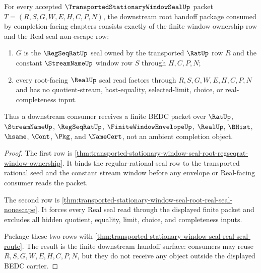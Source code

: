 \begin{theorem}
\label{thm:transported-stationary-window-seal-root-downstream-handoff-package}
For every accepted $\TransportedStationaryWindowSealUp$ packet $T=(R,S,G,W,E,H,C,P,N)$, the downstream root handoff package consumed by completion-facing chapters consists exactly of the finite window ownership row and the Real seal non-escape row:
\begin{enumerate}
\item $G$ is the $\RegSeqRatUp$ seal owned by the transported $\RatUp$ row $R$ and the constant $\StreamNameUp$ window row $S$ through $H,C,P,N$;
\item every root-facing $\RealUp$ seal read factors through $R,S,G,W,E,H,C,P,N$ and has no quotient-stream, host-equality, selected-limit, choice, or real-completeness input.
\end{enumerate}
Thus a downstream consumer receives a finite BEDC packet over $\RatUp$, $\StreamNameUp$, $\RegSeqRatUp$, $\FiniteWindowEnvelopeUp$, $\RealUp$, $\BHist$, $\hsame$, $\Cont$, $\Pkg$, and $\NameCert$, not an ambient completion object.
\end{theorem}
\begin{proof}
The first row is \autoref{thm:transported-stationary-window-seal-root-regseqrat-window-ownership}. It binds the regular-rational seal row to the transported rational seed and the constant stream window before any envelope or Real-facing consumer reads the packet.

The second row is \autoref{thm:transported-stationary-window-seal-root-real-seal-nonescape}. It forces every Real seal read through the displayed finite packet and excludes all hidden quotient, equality, limit, choice, and completeness inputs.

Package these two rows with \autoref{thm:transported-stationary-window-seal-real-seal-route}. The result is the finite downstream handoff surface: consumers may reuse $R,S,G,W,E,H,C,P,N$, but they do not receive any object outside the displayed BEDC carrier.
\end{proof}

